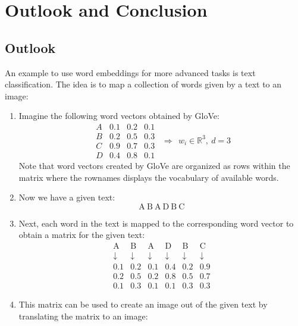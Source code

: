 \chapter{Outlook and Conclusion}\label{ch:conclusion}

\section{Outlook}

An example to use word embeddings for more advanced tasks is text classification. 
The idea is to map a collection of words given by a text to an image:

\begin{enumerate}
  \item 
    Imagine the following word vectors obtained by GloVe:
    \[
    \begin{array}{c|ccc}
      A & 0.1 & 0.2 & 0.1 \\
      B & 0.2 & 0.5 & 0.3 \\
      C & 0.9 & 0.7 & 0.3 \\
      D & 0.4 & 0.8 & 0.1
    \end{array} \ \ \Rightarrow \ \ w_i \in \mathbb{R}^3, \ d = 3
    \]
    Note that word vectors created by GloVe are organized as rows within the matrix
    where the rownames displays the vocabulary of available words.

  \item 
     Now we have a given text:
    \[
    \mathrm{A\ B\ A\ D\ B\ C}
    \]    

  \item  
    Next, each word in the text is mapped to the corresponding
    word vector to obtain a matrix for the given text:
    \[
    \begin{array}{cccccc}
    \mathrm{A} & \mathrm{B} & \mathrm{A} & \mathrm{D} & \mathrm{B} & \mathrm{C} \\
    \downarrow & \downarrow & \downarrow & \downarrow & \downarrow & \downarrow \\
    0.1 & 0.2 & 0.1 & 0.4 & 0.2 & 0.9 \\
    0.2 & 0.5 & 0.2 & 0.8 & 0.5 & 0.7 \\
    0.1 & 0.3 & 0.1 & 0.1 & 0.3 & 0.3
    \end{array}
    \]
  
  \item 
    This matrix can be used to create an image out of the 
    given text by translating the matrix to an image:


\end{enumerate}
